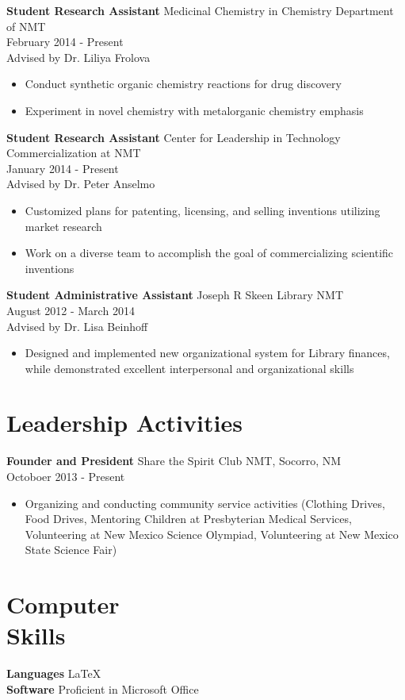 \documentclass[margin]{res}
\begin{document}
\begin{resume}
 {\bf Student Research Assistant}
 Medicinal Chemistry in Chemistry Department of NMT\\
 February 2014 - Present\\
 Advised by Dr. Liliya Frolova
 \begin{itemize} \itemsep -2pt  %
 \item Conduct synthetic organic chemistry reactions for drug discovery
 \item Experiment in novel chemistry with metalorganic chemistry emphasis
 \end{itemize}
 
{\bf Student Research Assistant}
 Center for Leadership in Technology Commercialization at NMT\\
 January 2014 - Present\\
 Advised by Dr. Peter Anselmo
\begin{itemize} \itemsep -2pt %
\item Customized plans for patenting, licensing, and selling inventions utilizing market research
\item Work on a diverse team to accomplish the goal of commercializing scientific inventions
\end{itemize}

{\bf Student Administrative Assistant}
Joseph R Skeen Library NMT\\
 August 2012 - March 2014\\
 Advised by Dr. Lisa Beinhoff             
 \begin{itemize} \itemsep -2pt %
  \item  Designed and implemented new organizational system for Library finances, while demonstrated excellent interpersonal and organizational skills
  \end{itemize}

\section{Leadership   Activities} 
               {\bf Founder and President} Share the Spirit Club NMT, Socorro, NM \\
	 Octoboer 2013 - Present
                \begin{itemize} \itemsep -2pt %
              \item Organizing and conducting community service activities (Clothing Drives, Food Drives, Mentoring Children at Presbyterian Medical Services, Volunteering at New Mexico Science Olympiad, Volunteering at New Mexico State Science Fair)
  \end{itemize}
 

\section{Computer \\ Skills}
  
    {\bf Languages} \LaTeX  \\
     {\bf Software} Proficient in Microsoft Office 


\end{resume} 
\end{document}
